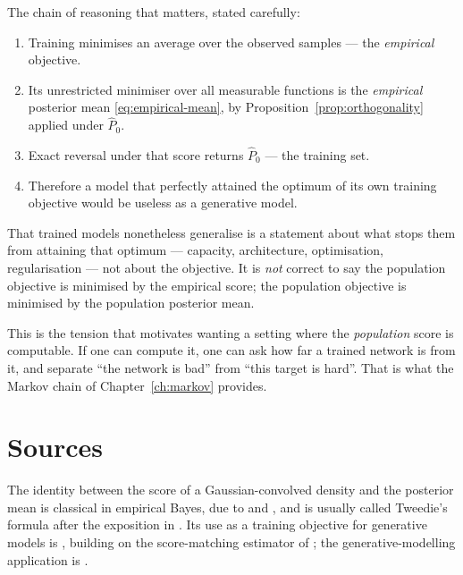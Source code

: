 \begin{pitfall}
The chain of reasoning that matters, stated carefully:
\begin{enumerate}[nosep]
\item Training minimises an average over the observed samples --- the \emph{empirical}
objective.
\item Its unrestricted minimiser over all measurable functions is the \emph{empirical}
posterior mean \eqref{eq:empirical-mean}, by Proposition~\ref{prop:orthogonality} applied
under $\widehat{P}_0$.
\item Exact reversal under that score returns $\widehat{P}_0$ --- the training set.
\item Therefore a model that perfectly attained the optimum of its own training objective
would be useless as a generative model.
\end{enumerate}
That trained models nonetheless generalise is a statement about what stops them from
attaining that optimum --- capacity, architecture, optimisation, regularisation --- not about
the objective. It is \emph{not} correct to say the population objective is minimised by the
empirical score; the population objective is minimised by the population posterior mean.
\end{pitfall}

\begin{intuition}
This is the tension that motivates wanting a setting where the \emph{population} score is
computable. If one can compute it, one can ask how far a trained network is from it, and
separate ``the network is bad'' from ``this target is hard''. That is what the Markov chain
of Chapter~\ref{ch:markov} provides.
\end{intuition}

\section*{Sources}
The identity between the score of a Gaussian-convolved density and the posterior mean is
classical in empirical Bayes, due to \citet{robbins1956empirical} and \citet{miyasawa1961empirical}, and is
usually called Tweedie's formula after the exposition in \citet{efron2011tweedie}. Its use as a
training objective for generative models is \citet{vincent2011connection}, building on the score-matching
estimator of \citet{hyvarinen2005estimation}; the generative-modelling application is \citet{song2019generative}.
